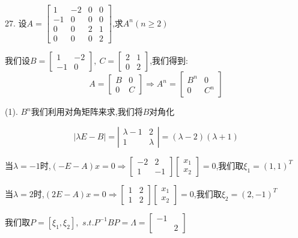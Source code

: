 27. 设$A=\left[ \begin{matrix}
	1&-2&0&0\\
	-1&0&0&0\\
	0&0&2&1\\
	0&0&0&2
\end{matrix}\right] $,求$A^n(n\geq 2)$
\begin{solution}
	
	我们设$B=\left[ \begin{matrix}
		1&-2\\-1&0
	\end{matrix}\right] ,\ C=\left[ \begin{matrix}
	2&1\\0&2
\end{matrix}\right]$,我们得到:  
$$A=\left[ \begin{matrix}
	B&0\\0&C
\end{matrix}\right]\Rightarrow A^{n}=\left[ \begin{matrix}
B^n&0\\0&C^n
\end{matrix}\right]$$

(1). $B^{n}$我们利用对角矩阵来求,我们将$B$对角化

$$|\lambda E-B|=|\begin{matrix}
	\lambda-1&2\\
	1&\lambda
\end{matrix}|=(\lambda-2)(\lambda+1)$$

当$\lambda=-1$时,$(-E-A)x=0\Rightarrow \left[\begin{matrix}
	-2&2\\1&-1
\end{matrix} \right]\left[\begin{matrix}
x_{1}\\x_{2}
\end{matrix} \right]=0$,我们取$\xi_{1}=(1,1)^T$

当$\lambda=2$时,$(2E-A)x=0\Rightarrow \left[\begin{matrix}
	1&2\\1&2
\end{matrix} \right]\left[\begin{matrix}
x_{1}\\x_{2}
\end{matrix} \right]=0$,我们取$\xi_{2}=(2,-1)^T$

我们取$P=[\xi_{1},\xi_{2}]$,\ $s.t. P^{-1}BP=\varLambda=\left[\begin{matrix}
	-1&\\ &2
\end{matrix} \right]$


\end{solution}
